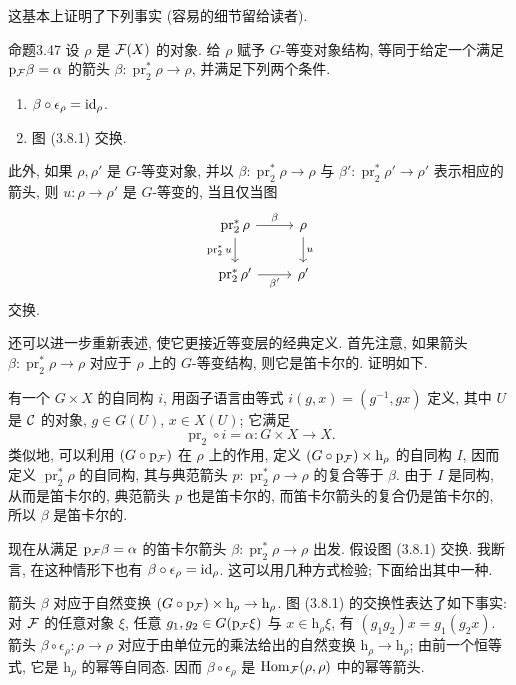 这基本上证明了下列事实 (容易的细节留给读者).

\begin{origstatement}{命题}{3.47}\label{ch03:prop347}
设 $\rho$ 是 $\mathcal F(X)$ 的对象. 给 $\rho$ 赋予 $G$-等变对象结构, 等同于给定一个满足 $\mathrm p_{\mathcal F}\beta=\alpha$ 的箭头 $\beta:\operatorname{pr}_2^*\rho\to\rho$, 并满足下列两个条件.
\begin{enumerate}
\item[(i)] $\beta\circ\epsilon_\rho=\mathrm{id}_\rho$.
\item[(ii)] 图 (3.8.1) 交换.
\end{enumerate}
此外, 如果 $\rho,\rho'$ 是 $G$-等变对象, 并以 $\beta:\operatorname{pr}_2^*\rho\to\rho$ 与 $\beta':\operatorname{pr}_2^*\rho'\to\rho'$ 表示相应的箭头, 则 $u:\rho\to\rho'$ 是 $G$-等变的, 当且仅当图
\[
\begin{tikzcd}
\operatorname{pr}_2^*\rho\arrow[r,"{\beta}"]\arrow[d,"{\operatorname{pr}_2^*u}"']&\rho\arrow[d,"{u}"]\\
\operatorname{pr}_2^*\rho'\arrow[r,"{\beta'}"']&\rho'
\end{tikzcd}
\]
交换.
\end{origstatement}

还可以进一步重新表述, 使它更接近等变层的经典定义. 首先注意, 如果箭头 $\beta:\operatorname{pr}_2^*\rho\to\rho$ 对应于 $\rho$ 上的 $G$-等变结构, 则它是笛卡尔的. 证明如下.

有一个 $G\times X$ 的自同构 $i$, 用函子语言由等式 $i(g,x)=(g^{-1},gx)$ 定义, 其中 $U$ 是 $\mathcal C$ 的对象, $g\in G(U)$, $x\in X(U)$; 它满足
\[
\operatorname{pr}_2\circ i=\alpha:G\times X\longrightarrow X.
\]
类似地, 可以利用 $(G\circ\mathrm p_{\mathcal F})$ 在 $\rho$ 上的作用, 定义 $(G\circ\mathrm p_{\mathcal F})\times\mathrm h_\rho$ 的自同构 $I$, 因而定义 $\operatorname{pr}_2^*\rho$ 的自同构, 其与典范箭头 $p:\operatorname{pr}_2^*\rho\to\rho$ 的复合等于 $\beta$. 由于 $I$ 是同构, 从而是笛卡尔的, 典范箭头 $p$ 也是笛卡尔的, 而笛卡尔箭头的复合仍是笛卡尔的, 所以 $\beta$ 是笛卡尔的.

现在从满足 $\mathrm p_{\mathcal F}\beta=\alpha$ 的笛卡尔箭头 $\beta:\operatorname{pr}_2^*\rho\to\rho$ 出发. 假设图 (3.8.1) 交换. 我断言, 在这种情形下也有 $\beta\circ\epsilon_\rho=\mathrm{id}_\rho$. 这可以用几种方式检验; 下面给出其中一种.

箭头 $\beta$ 对应于自然变换 $(G\circ\mathrm p_{\mathcal F})\times\mathrm h_\rho\to\mathrm h_\rho$. 图 (3.8.1) 的交换性表达了如下事实: 对 $\mathcal F$ 的任意对象 $\xi$, 任意 $g_1,g_2\in G(\mathrm p_{\mathcal F}\xi)$ 与 $x\in\mathrm h_\rho\xi$, 有 $(g_1g_2)x=g_1(g_2x)$. 箭头 $\beta\circ\epsilon_\rho:\rho\to\rho$ 对应于由单位元的乘法给出的自然变换 $\mathrm h_\rho\to\mathrm h_\rho$; 由前一个恒等式, 它是 $\mathrm h_\rho$ 的幂等自同态. 因而 $\beta\circ\epsilon_\rho$ 是 $\operatorname{Hom}_{\mathcal F}(\rho,\rho)$ 中的幂等箭头.

